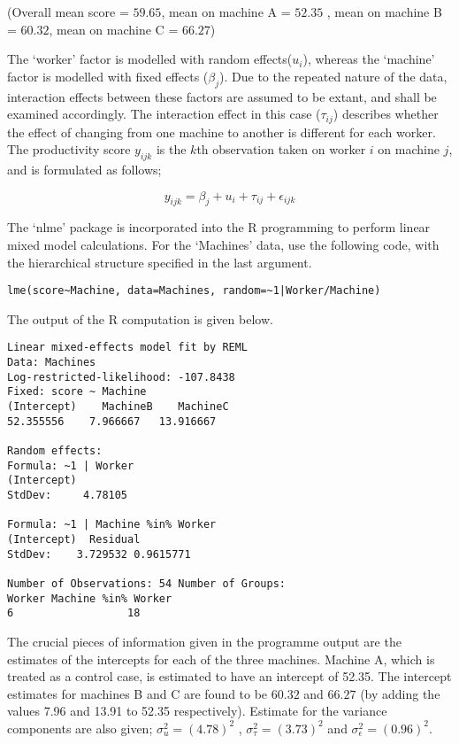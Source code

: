 \documentclass[12pt, a4paper]{report}
\theoremstyle{plain}
\theoremstyle{definition}
\theoremstyle{remark}
\begin{document}
(Overall mean score = $59.65$, mean on machine A = $52.35$ , mean
on machine B = $60.32$, mean on machine C = $66.27$)


The `worker' factor is modelled with random effects($u_{i}$),
whereas the `machine' factor is modelled with fixed effects
($\beta_{j}$). Due to the repeated nature of the data, interaction
effects between these factors are assumed to be extant, and shall
be examined accordingly. The interaction effect in this case
($\tau_{ij}$) describes whether the effect of changing from one
machine to another is different for each worker. The productivity
score $y_{ijk}$ is the $k$th observation taken on worker $i$ on
machine $j$, and is formulated
as follows;

\begin{equation}
y_{ijk} = \beta_{j} + u_{i} + \tau_{ij} + \epsilon_{ijk}
\end{equation}

The `nlme' package is incorporated into the R programming to
perform linear mixed model calculations. For the `Machines' data,
\citet{pb} use the following code, with the hierarchical structure
specified in the last argument.
\begin{verbatim}
lme(score~Machine, data=Machines, random=~1|Worker/Machine)
\end{verbatim}


The output of the R computation is given below.
\begin{verbatim}
Linear mixed-effects model fit by REML
Data: Machines
Log-restricted-likelihood: -107.8438
Fixed: score ~ Machine
(Intercept)    MachineB    MachineC
52.355556    7.966667   13.916667

Random effects:
Formula: ~1 | Worker
(Intercept)
StdDev:     4.78105

Formula: ~1 | Machine %in% Worker
(Intercept)  Residual
StdDev:    3.729532 0.9615771

Number of Observations: 54 Number of Groups:
Worker Machine %in% Worker
6                  18

\end{verbatim}


The crucial pieces of information given in the programme output
are the estimates of the intercepts for each of the three
machines. Machine A, which is treated as a control case, is
estimated to have an intercept of 52.35. The intercept estimates
for machines B and C are found to be $60.32$ and $66.27$ (by
adding the values 7.96 and 13.91 to 52.35 respectively). Estimate
for the variance components are also given; $\sigma^{2}_{u} =
(4.78)^{2}$ , $\sigma^{2}_{\tau} = (3.73)^{2}$ and
$\sigma^{2}_{\epsilon} = (0.96)^{2}$.
\end{document}
